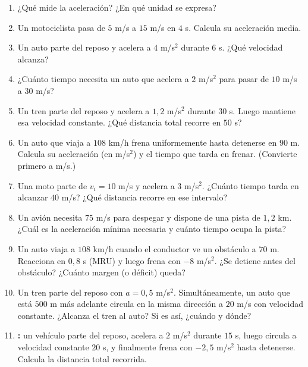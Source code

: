 \documentclass[12pt, letterpaper]{article}
\begin{document}
\begin{enumerate}[leftmargin=*, resume]
  \item \facil{} ¿Qué mide la aceleración? ¿En qué unidad se expresa?

  \item \facil{} Un motociclista pasa de $5$ m/s a $15$ m/s en $4$ s. Calcula su aceleración media.

  \item \facil{} Un auto parte del reposo y acelera a $4$ m/s$^2$ durante $6$ s. ¿Qué velocidad alcanza?

  \item \facil{} ¿Cuánto tiempo necesita un auto que acelera a $2$ m/s$^2$ para pasar de $10$ m/s a $30$ m/s?

  \item \medio{} Un tren parte del reposo y acelera a $1{,}2$ m/s$^2$ durante $30$ s. Luego mantiene esa velocidad constante. ¿Qué distancia total recorre en $50$ s?

  \item \medio{} Un auto que viaja a $108$ km/h frena uniformemente hasta detenerse en $90$ m. Calcula su aceleración (en m/s$^2$) y el tiempo que tarda en frenar. (Convierte primero a m/s.)

  \item \medio{} Una moto parte de $v_i = 10$ m/s y acelera a $3$ m/s$^2$. ¿Cuánto tiempo tarda en alcanzar $40$ m/s? ¿Qué distancia recorre en ese intervalo?

  \item \medio{} Un avión necesita $75$ m/s para despegar y dispone de una pista de $1{,}2$ km. ¿Cuál es la aceleración mínima necesaria y cuánto tiempo ocupa la pista?

  \item \dificil{} Un auto viaja a $108$ km/h cuando el conductor ve un obstáculo a $70$ m. Reacciona en $0{,}8$ s (MRU) y luego frena con $-8$ m/s$^2$. ¿Se detiene antes del obstáculo? ¿Cuánto margen (o déficit) queda?

  \item \dificil{} Un tren parte del reposo con $a = 0{,}5$ m/s$^2$. Simultáneamente, un auto que está $500$ m más adelante circula en la misma dirección a $20$ m/s con velocidad constante. ¿Alcanza el tren al auto? Si es así, ¿cuándo y dónde?

  \item \dificil{} \textbf{:} un vehículo parte del reposo, acelera a $2$ m/s$^2$ durante $15$ s, luego circula a velocidad constante $20$ s, y finalmente frena con $-2{,}5$ m/s$^2$ hasta detenerse. Calcula la distancia total recorrida.
\end{enumerate}
\end{document}
